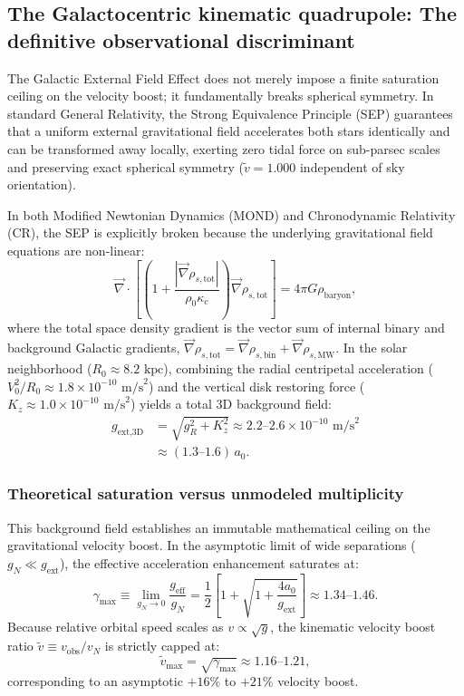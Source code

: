 \documentclass[aps,prd,reprint,superscriptaddress,nofootinbib,floatfix,amsmath,amssymb]{revtex4-2}
\begin{document}
\subsection{The Galactocentric kinematic quadrupole: The definitive observational discriminant}
\label{subsec:quadrupole_signature}

The Galactic External Field Effect does not merely impose a finite saturation ceiling on the velocity boost; it fundamentally breaks spherical symmetry. In standard General Relativity, the Strong Equivalence Principle (SEP) guarantees that a uniform external gravitational field accelerates both stars identically and can be transformed away locally, exerting zero tidal force on sub-parsec scales and preserving exact spherical symmetry ($\tilde{v} = 1.000$ independent of sky orientation).

In both Modified Newtonian Dynamics (MOND) and Chronodynamic Relativity (CR), the SEP is explicitly broken because the underlying gravitational field equations are non-linear:
\begin{equation}
\vec{\nabla} \cdot \left[ \left(1 + \frac{|\vec{\nabla}\rho_{s,\text{tot}}|}{\rho_0 \kappa_c}\right) \vec{\nabla}\rho_{s,\text{tot}} \right] = 4\pi G \rho_{\text{baryon}},
\end{equation}
where the total space density gradient is the vector sum of internal binary and background Galactic gradients, $\vec{\nabla}\rho_{s,\text{tot}} = \vec{\nabla}\rho_{s,\text{bin}} + \vec{\nabla}\rho_{s,\text{MW}}$. In the solar neighborhood ($R_0 \approx 8.2\text{ kpc}$), combining the radial centripetal acceleration ($V_0^2/R_0 \approx 1.8 \times 10^{-10}\text{ m/s}^2$) and the vertical disk restoring force ($K_z \approx 1.0 \times 10^{-10}\text{ m/s}^2$) yields a total 3D background field:
\begin{align}
g_{\text{ext,3D}} &= \sqrt{g_R^2 + K_z^2} \approx 2.2\text{--}2.6 \times 10^{-10}\text{ m/s}^2 \nonumber \\
&\approx (1.3\text{--}1.6)\,a_0.
\end{align}

\subsubsection{Theoretical saturation versus unmodeled multiplicity}
This background field establishes an immutable mathematical ceiling on the gravitational velocity boost. In the asymptotic limit of wide separations ($g_N \ll g_{\text{ext}}$), the effective acceleration enhancement saturates at:
\begin{equation}
\gamma_{\text{max}} \equiv \lim_{g_N \to 0} \frac{g_{\text{eff}}}{g_N} = \frac{1}{2} \left[ 1 + \sqrt{1 + \frac{4 a_0}{g_{\text{ext}}}} \right] \approx 1.34\text{--}1.46.
\end{equation}
Because relative orbital speed scales as $v \propto \sqrt{g}$, the kinematic velocity boost ratio $\tilde{v} \equiv v_{\text{obs}} / v_N$ is strictly capped at:
\begin{equation}
\tilde{v}_{\text{max}} = \sqrt{\gamma_{\text{max}}} \approx 1.16\text{--}1.21,
\end{equation}
corresponding to an asymptotic $+16\%$ to $+21\%$ velocity boost.
\end{document}
